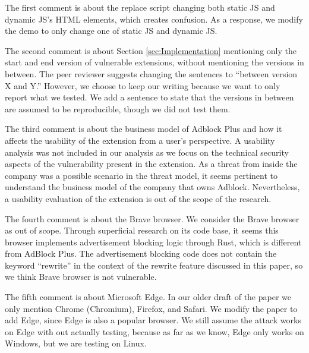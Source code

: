 \documentclass[conference]{IEEEtran}
\begin{document}
\begin{appendices}
The first comment is about the replace script changing both static JS and dynamic JS's HTML elements, which creates confusion. As a response, we modify the demo to only change one of static JS and dynamic JS.

The second comment is about Section \ref{sec:Implementation} mentioning only the start and end version of vulnerable extensions, without mentioning the versions in between. The peer reviewer suggests changing the sentences to ``between version X and Y.'' However, we choose to keep our writing because we want to only report what we tested. We add a sentence to state that the versions in between are assumed to be reproducible, though we did not test them.

The third comment is about the business model of Adblock Plus and how it affects the usability of the extension from a user's perspective. A usability analysis was not included in our analysis as we focus on the technical security aspects of the vulnerability present in the extension. As a threat from inside the company was a possible scenario in the threat model, it seems pertinent to understand the business model of the company that owns Adblock. Nevertheless, a usability evaluation of the extension is out of the scope of the research.

The fourth comment is about the Brave browser. We consider the Brave browser as out of scope. Through superficial research on its code base, it seems this browser implements advertisement blocking logic through Rust, which is different from AdBlock Plus. The advertisement blocking code does not contain the keyword ``rewrite'' in the context of the rewrite feature discussed in this paper, so we think Brave browser is not vulnerable.

The fifth comment is about Microsoft Edge. In our older draft of the paper we only mention Chrome (Chromium), Firefox, and Safari. We modify the paper to add Edge, since Edge is also a popular browser. We still assume the attack works on Edge with out actually testing, because as far as we know, Edge only works on Windows, but we are testing on Linux.

\end{appendices}
\end{document}
